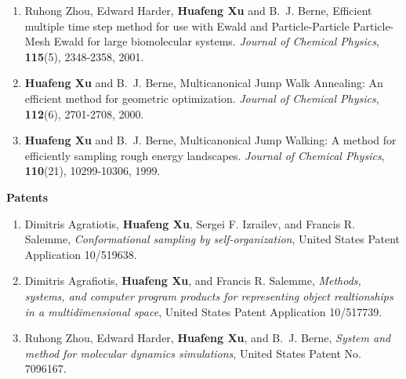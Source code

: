 \documentclass[11pt]{article}
\begin{document}
\begin{enumerate}
\item
Ruhong Zhou, Edward Harder, \textbf{Huafeng Xu} and B.~J. Berne, Efficient multiple time step method for use with Ewald and Particle-Particle Particle-Mesh Ewald for large biomolecular systems. \textit{Journal of Chemical Physics}, \textbf{115}(5), 2348-2358, 2001.
\item
\textbf{Huafeng Xu} and B.~J. Berne, Multicanonical Jump Walk Annealing: An efficient method for geometric optimization. \textit{Journal of Chemical Physics}, \textbf{112}(6), 2701-2708, 2000.
\item
\textbf{Huafeng Xu} and B.~J. Berne, Multicanonical Jump Walking: A method for efficiently sampling rough energy landscapes. \textit{Journal of Chemical Physics}, \textbf{110}(21), 10299-10306, 1999.

\end{enumerate}

{\large \textbf{Patents}}

\begin{enumerate}
\item
Dimitris Agratiotis, \textbf{Huafeng Xu}, Sergei F. Izrailev, and Francis R. Salemme, \textit{Conformational sampling by self-organization}, United States Patent Application 10/519638.
\item
Dimitris Agrafiotis, \textbf{Huafeng Xu}, and Francis R. Salemme, \textit{Methods, systems, and computer program products for representing object realtionships in a multidimensional space}, United States Patent Application 10/517739.
\item
Ruhong Zhou, Edward Harder, \textbf{Huafeng Xu}, and B.~J. Berne, \textit{System and method for molecular dynamics simulations}, United States Patent No. 7096167.
\end{enumerate}
\end{document}
